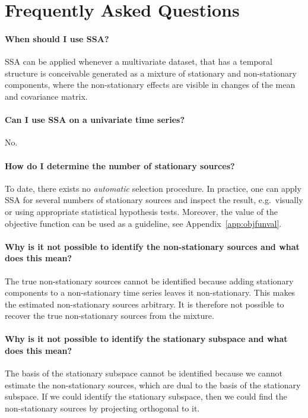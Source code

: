 \documentclass{article}
\newcommand{\1}{\ensuremath{\mathds{1}}}
\newcommand{\0}{\ensuremath{0}}
\begin{document}
\FloatBarrier

\section{Frequently Asked Questions}
\label{sec:faq}

\paragraph{When should I use SSA?} 
SSA can be applied whenever a multivariate dataset, that has a temporal structure is conceivable 
generated as a mixture of stationary and non-stationary components, where the non-stationary 
effects are visible in changes of the mean and covariance matrix. 

\paragraph{Can I use SSA on a univariate time series?} No. 

\paragraph{How do I determine the number of stationary sources?} To date, there exists no \textit{automatic}
selection procedure. In practice, one can apply SSA for several numbers of stationary sources and inspect
the result, e.g.~visually or using appropriate statistical hypothesis tests. Moreover, the value of the 
objective function can be used as a guideline, see Appendix~\ref{app:objfunval}.

\paragraph{Why is it not possible to identify the non-stationary sources and what does this mean?} 
The true non-stationary sources cannot be identified because adding stationary components to a 
non-stationary time series leaves it non-stationary. This makes the estimated non-stationary sources 
arbitrary. It is therefore not possible to recover the true non-stationary sources from the mixture. 
	
\paragraph{Why is it not possible to identify the stationary subspace and what does this mean?} The basis
of the stationary subspace cannot be identified because we cannot estimate the non-stationary sources, which
are dual to the basis of the stationary subspace. If we could identify the stationary subspace, then we could
find the non-stationary sources by projecting orthogonal to it.
\end{document}
